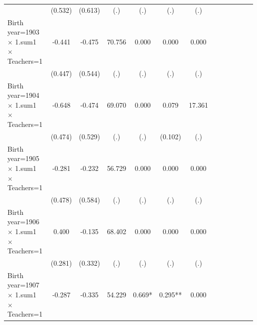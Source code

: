 {\begin{tabular}{l*{12}{c}}
                    &     (0.532)   &     (0.613)   &         (.)   &         (.)   &         (.)   &         (.)   &               &               &               &               &               &               \\
Birth year=1903 $\times$ 1.sum1 $\times$ Teachers=1&      -0.441   &      -0.475   &      70.756   &       0.000   &       0.000   &       0.000   &               &               &               &               &               &               \\
                    &     (0.447)   &     (0.544)   &         (.)   &         (.)   &         (.)   &         (.)   &               &               &               &               &               &               \\
Birth year=1904 $\times$ 1.sum1 $\times$ Teachers=1&      -0.648   &      -0.474   &      69.070   &       0.000   &       0.079   &      17.361   &               &               &               &               &               &               \\
                    &     (0.474)   &     (0.529)   &         (.)   &         (.)   &     (0.102)   &         (.)   &               &               &               &               &               &               \\
Birth year=1905 $\times$ 1.sum1 $\times$ Teachers=1&      -0.281   &      -0.232   &      56.729   &       0.000   &       0.000   &       0.000   &               &               &               &               &               &               \\
                    &     (0.478)   &     (0.584)   &         (.)   &         (.)   &         (.)   &         (.)   &               &               &               &               &               &               \\
Birth year=1906 $\times$ 1.sum1 $\times$ Teachers=1&       0.400   &      -0.135   &      68.402   &       0.000   &       0.000   &       0.000   &               &               &               &               &               &               \\
                    &     (0.281)   &     (0.332)   &         (.)   &         (.)   &         (.)   &         (.)   &               &               &               &               &               &               \\
Birth year=1907 $\times$ 1.sum1 $\times$ Teachers=1&      -0.287   &      -0.335   &      54.229   &       0.669*  &       0.295** &       0.000   &               &               &               &               &               &               \\

\end{tabular}}
